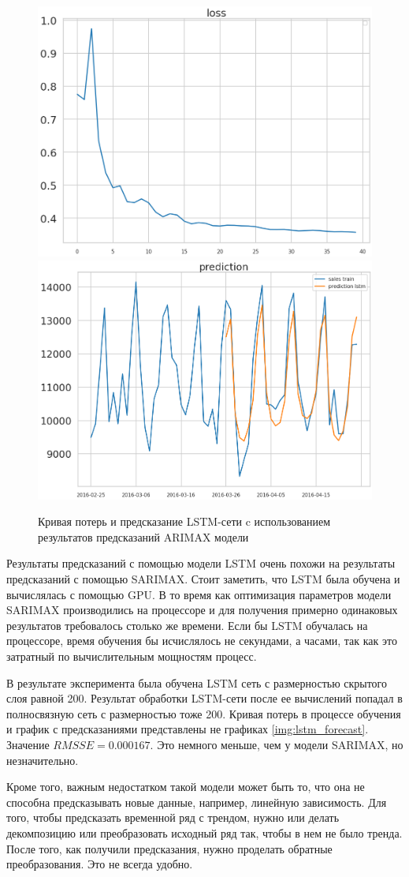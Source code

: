 \def\figurename{Рис}
\begin{figure}[t]
	\centering
	\includegraphics[width=0.4\columnwidth]{./img/lstm_with_arima_loss.png}
	\includegraphics[width=0.4\columnwidth]{./img/lstm_with_arima_prediction.png}
	\caption{Кривая потерь и предсказание LSTM-сети c использованием результатов предсказаний ARIMAX модели}
	\label{img:lstm_with_arima_forecast}
\end{figure}

Результаты предсказаний с помощью модели LSTM очень похожи на результаты предсказаний
с помощью SARIMAX. Стоит заметить, что LSTM была обучена и вычислялась с помощью GPU.
В то время как оптимизация параметров модели SARIMAX производились на процессоре и
для получения примерно одинаковых результатов требовалось столько же времени.
Если бы LSTM обучалась на процессоре, время обучения бы исчислялось не секундами, а часами,
так как это затратный по вычислительным мощностям процесс.

В результате эксперимента была обучена LSTM сеть с размерностью скрытого слоя равной 200.
Результат обработки LSTM-сети после ее вычислений попадал в полносвязную сеть с размерностью
тоже 200. Кривая потерь в процессе обучения и график с предсказаниями представлены не графиках \ref{img:lstm_forecast}.
Значение $ RMSSE = 0.000167 $. Это немного меньше, чем у модели SARIMAX, но незначительно.

Кроме того, важным недостатком такой модели может быть то, что она не
способна предсказывать новые данные, например, линейную зависимость.
Для того, чтобы предсказать временной ряд с трендом, нужно или делать
декомпозицию или преобразовать исходный ряд так, чтобы в нем не было тренда.
После того, как получили предсказания, нужно проделать обратные преобразования.
Это не всегда удобно.

